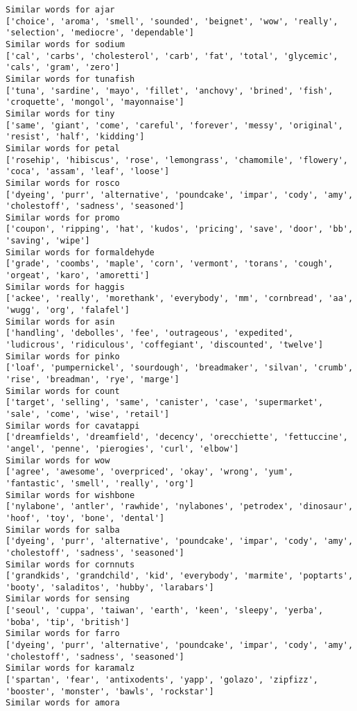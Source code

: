 \documentclass[11pt]{article}
\begin{document}
\begin{Verbatim}[commandchars=\\\{\}]
Similar words for ajar
['choice', 'aroma', 'smell', 'sounded', 'beignet', 'wow', 'really', 'selection', 'mediocre', 'dependable']
Similar words for sodium
['cal', 'carbs', 'cholesterol', 'carb', 'fat', 'total', 'glycemic', 'cals', 'gram', 'zero']
Similar words for tunafish
['tuna', 'sardine', 'mayo', 'fillet', 'anchovy', 'brined', 'fish', 'croquette', 'mongol', 'mayonnaise']
Similar words for tiny
['same', 'giant', 'come', 'careful', 'forever', 'messy', 'original', 'resist', 'half', 'kidding']
Similar words for petal
['rosehip', 'hibiscus', 'rose', 'lemongrass', 'chamomile', 'flowery', 'coca', 'assam', 'leaf', 'loose']
Similar words for rosco
['dyeing', 'purr', 'alternative', 'poundcake', 'impar', 'cody', 'amy', 'cholestoff', 'sadness', 'seasoned']
Similar words for promo
['coupon', 'ripping', 'hat', 'kudos', 'pricing', 'save', 'door', 'bb', 'saving', 'wipe']
Similar words for formaldehyde
['grade', 'coombs', 'maple', 'corn', 'vermont', 'torans', 'cough', 'orgeat', 'karo', 'amoretti']
Similar words for haggis
['ackee', 'really', 'morethank', 'everybody', 'mm', 'cornbread', 'aa', 'wugg', 'org', 'falafel']
Similar words for asin
['handling', 'debolles', 'fee', 'outrageous', 'expedited', 'ludicrous', 'ridiculous', 'coffegiant', 'discounted', 'twelve']
Similar words for pinko
['loaf', 'pumpernickel', 'sourdough', 'breadmaker', 'silvan', 'crumb', 'rise', 'breadman', 'rye', 'marge']
Similar words for count
['target', 'selling', 'same', 'canister', 'case', 'supermarket', 'sale', 'come', 'wise', 'retail']
Similar words for cavatappi
['dreamfields', 'dreamfield', 'decency', 'orecchiette', 'fettuccine', 'angel', 'penne', 'pierogies', 'curl', 'elbow']
Similar words for wow
['agree', 'awesome', 'overpriced', 'okay', 'wrong', 'yum', 'fantastic', 'smell', 'really', 'org']
Similar words for wishbone
['nylabone', 'antler', 'rawhide', 'nylabones', 'petrodex', 'dinosaur', 'hoof', 'toy', 'bone', 'dental']
Similar words for salba
['dyeing', 'purr', 'alternative', 'poundcake', 'impar', 'cody', 'amy', 'cholestoff', 'sadness', 'seasoned']
Similar words for cornnuts
['grandkids', 'grandchild', 'kid', 'everybody', 'marmite', 'poptarts', 'booty', 'saladitos', 'hubby', 'larabars']
Similar words for sensing
['seoul', 'cuppa', 'taiwan', 'earth', 'keen', 'sleepy', 'yerba', 'boba', 'tip', 'british']
Similar words for farro
['dyeing', 'purr', 'alternative', 'poundcake', 'impar', 'cody', 'amy', 'cholestoff', 'sadness', 'seasoned']
Similar words for karamalz
['spartan', 'fear', 'antixodents', 'yapp', 'golazo', 'zipfizz', 'booster', 'monster', 'bawls', 'rockstar']
Similar words for amora

\end{Verbatim}
\end{document}
